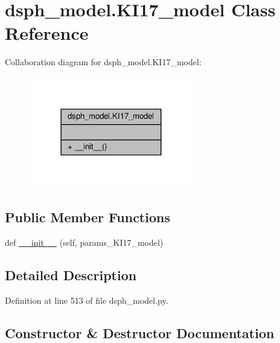 \hypertarget{classdsph__model_1_1KI17__model}{}\section{dsph\+\_\+model.\+K\+I17\+\_\+model Class Reference}
\label{classdsph__model_1_1KI17__model}


Collaboration diagram for dsph\+\_\+model.\+K\+I17\+\_\+model\+:\nopagebreak
\begin{figure}[H]
\begin{center}
\leavevmode
\includegraphics[width=204pt]{d9/df4/classdsph__model_1_1KI17__model__coll__graph}
\end{center}
\end{figure}
\subsection*{Public Member Functions}
\begin{DoxyCompactItemize}
\item 
def \hyperlink{classdsph__model_1_1KI17__model_a1d6cea3b72b61fc41cbf8aa6cc2fd582}{\+\_\+\+\_\+init\+\_\+\+\_\+} (self, params\+\_\+\+K\+I17\+\_\+model)
\end{DoxyCompactItemize}


\subsection{Detailed Description}


Definition at line 513 of file dsph\+\_\+model.\+py.



\subsection{Constructor \& Destructor Documentation}
\mbox{\label{classdsph__model_1_1KI17__model_a1d6cea3b72b61fc41cbf8aa6cc2fd582}} 
